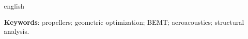 \begin{resumo}[ABSTRACT]
\begin{otherlanguage*}{english}
\SingleSpacing
\noindent
{}

\vspace{\onelineskip}
\noindent
\textbf{Keywords}: propellers; geometric optimization; BEMT; aeroacoustics; structural analysis.
\end{otherlanguage*}
\end{resumo}
